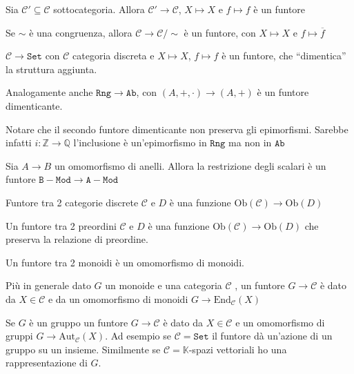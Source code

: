 \begin{example}{}
    Sia \(\mathcal{C}' \subseteq \mathcal{C} \) sottocategoria. Allora \(\mathcal{C}' \to \mathcal{C}\), \(X \mapsto X\) e \(f \mapsto f\) è un funtore
\end{example}

\begin{example}{}
    Se \(\sim \) è una congruenza, allora \(\mathcal{C} \to \mathcal{C} /\sim\) è un funtore, con
    \(X \mapsto X\) e \(f \mapsto \overline{f}\) 
\end{example}

\begin{example}
    \(\mathcal{C} \to \mathtt{Set}\) con \(\mathcal{C}\) categoria discreta e \(X \mapsto X\), \(f
    \mapsto f\) è un funtore, che ``dimentica'' la struttura aggiunta.

    Analogamente anche \(\mathtt{Rng} \to \mathtt{Ab}\), con \({(A, +, \cdot )} \to {(A, +)}\) è un funtore dimenticante.
\end{example}
\begin{remark}{}
    Notare che il secondo funtore dimenticante non preserva gli epimorfismi.
    Sarebbe infatti \(i : \mathbb{Z} \to \mathbb{Q}\) l'inclusione è
    un'epimorfismo in \(\mathtt{Rng}\) ma non in \(\mathtt{Ab}\) 
\end{remark}


\begin{example}{}
    Sia \(A \to B\) un omomorfismo di anelli. Allora la restrizione degli
    scalari è un funtore \(\mathtt{B-Mod} \to \mathtt{A-Mod}\) 
\end{example}


\begin{example}{}
    Funtore tra 2 categorie discrete \(\mathcal{C}\) e \(D\) è una funzione \(\mathrm{Ob}{(\mathcal{C})} \to \mathrm{Ob}{(D)}\) 
\end{example}

\begin{example}{}
    Un funtore tra 2 preordini \(\mathcal{C}\) e \(D\) è una funzione \(\mathrm{Ob}{(\mathcal{C})} \to \mathrm{Ob}{(D)}\)  che preserva la relazione di preordine.
\end{example}

\begin{example}{}
    Un funtore tra 2 monoidi è un omomorfismo di monoidi.

    Più in generale dato \(G\)  un monoide e una categoria \(\mathcal{C}\) , un funtore \(G \to \mathcal{C}\) è dato da \(X \in \mathcal{C}\) e da un omomorfismo di monoidi \(G \to \mathrm{End}_\mathcal{C}{(X)}\) 

    Se \(G\) è un gruppo un funtore \(G \to \mathcal{C}\) è dato da \(X \in \mathcal{C}\) e un
    omomorfismo di gruppi \(G \to \mathrm{Aut}_\mathcal{C}{(X)}\). Ad esempio se \(\mathcal{C} = \mathtt{Set}\) il funtore dà un'azione di un gruppo su un insieme.
    Similmente se \(\mathcal{C} = \mathbb{K}\)-spazi vettoriali ho una rappresentazione di
    \(G\).
\end{example}

